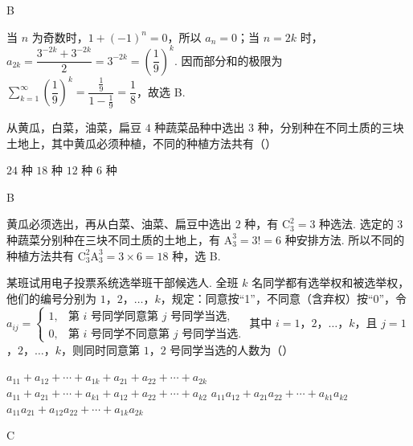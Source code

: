 \begin{answer}
B
\end{answer}

\begin{solution}
当 \(n\) 为奇数时，\(1+(-1)^n=0\)，所以 \(a_n=0\)；当 \(n=2k\) 时，
\(a_{2k}=\dfrac{3^{-2k}+3^{-2k}}{2}=3^{-2k}=\left(\dfrac19\right)^k\). 因而部分和的极限为
\(\displaystyle\sum_{k=1}^{\infty}\left(\dfrac19\right)^k=\dfrac{\frac19}{1-\frac19}=\dfrac18\)，故选 B.
\end{solution}

\begin{problem}
从黄瓜，白菜，油菜，扁豆 \(4\) 种蔬菜品种中选出 \(3\) 种，分别种在不同土质的三块土地上，其中黄瓜必须种植，不同的种植方法共有（\quad）

\choices
    {\(24\) 种}
    {\(18\) 种}
    {\(12\) 种}
    {\(6\) 种}
\end{problem}

\begin{answer}
B
\end{answer}

\begin{solution}
黄瓜必须选出，再从白菜、油菜、扁豆中选出 \(2\) 种，有 \(\mathrm C_3^2=3\) 种选法. 选定的 \(3\) 种蔬菜分别种在三块不同土质的土地上，有 \(\mathrm A_3^3=3!=6\) 种安排方法. 所以不同的种植方法共有 \(\mathrm C_3^2\mathrm A_3^3=3\times6=18\) 种，选 B.
\end{solution}

\begin{problem}
某班试用电子投票系统选举班干部候选人. 全班 \(k\) 名同学都有选举权和被选举权，他们的编号分别为 \(1\)，\(2\)，\(\ldots\)，\(k\)，规定：同意按“1”，不同意（含弃权）按“0”，令
\(a_{ij} = \begin{cases}
1,& \text{第 } i\text{ 号同学同意第 }j\text{ 号同学当选},\\
0,& \text{第 } i\text{ 号同学不同意第 }j\text{ 号同学当选}.
\end{cases}\)
其中 \(i = 1\)，\(2\)，\(\ldots\)，\(k\)，且 \(j = 1\)，\(2\)，\(\ldots\)，\(k\)，则同时同意第 \(1\)，\(2\) 号同学当选的人数为（\quad）

\choices
    {\(a_{11} + a_{12} + \cdots + a_{1k} + a_{21} + a_{22} + \cdots + a_{2k}\)}
    {\(a_{11} + a_{21} + \cdots + a_{k1} + a_{12} + a_{22} + \cdots + a_{k2}\)}
    {\(a_{11}a_{12} + a_{21}a_{22} + \cdots + a_{k1}a_{k2}\)}
    {\(a_{11}a_{21} + a_{12}a_{22} + \cdots + a_{1k}a_{2k}\)}
\end{problem}

\begin{answer}
C
\end{answer}

